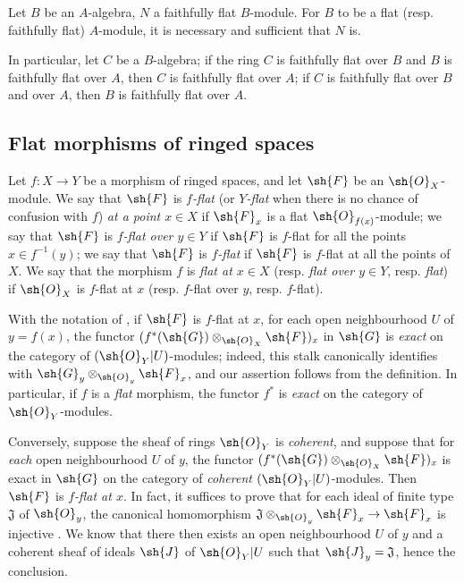 \begin{env}[6.6.4]
\label{0.6.6.4}
Let $B$ be an $A$-algebra, $N$ a faithfully flat $B$-module. For $B$ to be a flat
(resp. faithfully flat) $A$-module, it is necessary and sufficient that $N$ is.

In particular, let $C$ be a $B$-algebra; if the ring $C$ is faithfully flat over $B$ and $B$
is faithfully flat over $A$, then $C$ is faithfully flat over $A$; if $C$ is faithfully flat
over $B$ and over $A$, then $B$ is faithfully flat over $A$.
\end{env}

\subsection{Flat morphisms of ringed spaces}
\label{subsection:0.6.7}

\begin{env}[6.7.1]
\label{0.6.7.1}
Let $f:X\to Y$ be a morphism of ringed spaces, and let $\sh{F}$ be an $\sh{O}_X$-module. We say
that $\sh{F}$ is \emph{$f$-flat} (or \emph{$Y$-flat} when there is no chance of confusion
with $f$) \emph{at a point $x\in X$} if $\sh{F}_x$ is a flat $\sh{O}_{f(x)}$-module; we say that
$\sh{F}$ is \emph{$f$-flat over $y\in Y$} if $\sh{F}$ is $f$-flat for all the points
$x\in f^{-1}(y)$; we say that $\sh{F}$ is \emph{$f$-flat} if $\sh{F}$ is $f$-flat at all the
points of $X$. We say that the morphism $f$ is \emph{flat at $x\in X$} (resp. \emph{flat over
$y\in Y$}, resp. \emph{flat}) if $\sh{O}_X$ is $f$-flat at $x$ (resp. $f$-flat over $y$, resp.
$f$-flat).
\end{env}

\begin{env}[6.7.2]
\label{0.6.7.2}
With the notation of , if $\sh{F}$ is $f$-flat at $x$, for each open
neighbourhood $U$ of $y=f(x)$, the functor $(f^*(\sh{G})\otimes_{\sh{O}_X}\sh{F})_x$ in $\sh{G}$
is \emph{exact} on the category of $(\sh{O}_Y|U)$-modules; indeed, this stalk canonically
identifies with $\sh{G}_y\otimes_{\sh{O}_y}\sh{F}_x$, and our assertion follows from the
definition. In particular, if $f$ is a \emph{flat} morphism, the functor $f^*$ is
\emph{exact} on the category of $\sh{O}_Y$-modules.
\end{env}

\begin{env}[6.7.3]
\label{0.6.7.3}
Conversely, suppose the sheaf of rings $\sh{O}_Y$ is \emph{coherent}, and suppose that for
\emph{each} open neighbourhood $U$ of $y$, the functor $(f^*(\sh{G})\otimes_{\sh{O}_X}\sh{F})_x$
is exact in $\sh{G}$ on the category of \emph{coherent} $(\sh{O}_Y|U)$-modules. Then $\sh{F}$ is
\emph{$f$-flat at $x$}. In fact, it suffices to prove that for each ideal of finite type
$\mathfrak{J}$ of $\sh{O}_y$, the canonical homomorphism
$\mathfrak{J}\otimes_{\sh{O}_y}\sh{F}_x\to\sh{F}_x$ is injective . We know
 that there then exists an open neighbourhood
$U$ of $y$ and a coherent sheaf of ideals $\sh{J}$ of $\sh{O}_Y|U$ such that
$\sh{J}_y=\mathfrak{J}$, hence the conclusion.
\end{env}

